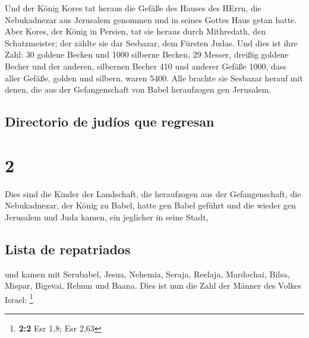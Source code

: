  Und der König Kores tat heraus die Gefäße des Hauses des
HErrn, die Nebukadnezar aus Jerusalem genommen und in seines Gottes Haus
getan hatte.  Aber Kores, der König in Persien, tat sie
heraus durch Mithredath, den Schatzmeister; der zählte sie dar Sesbazar,
dem Fürsten Judas.  Und dies ist ihre Zahl: 30 goldene
Becken und 1000 silberne Becken, 29 Messer,  dreißig
goldene Becher und der anderen, silbernen Becher 410 und anderer Gefäße
1000,  dass aller Gefäße, golden und silbern, waren 5400.
Alle brachte sie Sesbazar herauf mit denen, die aus der Gefangenschaft
von Babel heraufzogen gen Jerusalem.

\hypertarget{directorio-de-juduxedos-que-regresan}{%
\subsection{Directorio de judíos que
regresan}\label{directorio-de-juduxedos-que-regresan}}

\hypertarget{section-1}{%
\section{2}\label{section-1}}

 Dies sind die Kinder der Landschaft, die heraufzogen aus
der Gefangenschaft, die Nebukadnezar, der König zu Babel, hatte gen
Babel geführt und die wieder gen Jerusalem und Juda kamen, ein jeglicher
in seine Stadt,

\hypertarget{lista-de-repatriados}{%
\subsection{Lista de repatriados}\label{lista-de-repatriados}}

 und kamen mit Serubabel, Jesua, Nehemia, Seraja, Reelaja,
Mardochai, Bilsa, Mispar, Bigevai, Rehum und Baana. Dies ist nun die
Zahl der Männer des Volkes Israel: \footnote{\textbf{2:2} Esr 1,8; Esr
  2,63}

